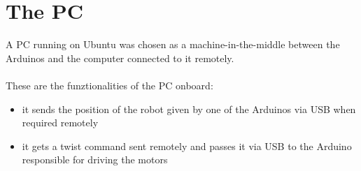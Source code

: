 \chapter{The PC}
A PC running on Ubuntu was chosen as a machine-in-the-middle between the Arduinos and the computer connected to it remotely.
\\ \\
These are the funztionalities of the PC onboard:
\begin{itemize}
    \item it sends the position of the robot given by one of the Arduinos via USB when required remotely
    \item it gets a twist command sent remotely and passes it via USB to the Arduino responsible for driving the motors
\end{itemize}
